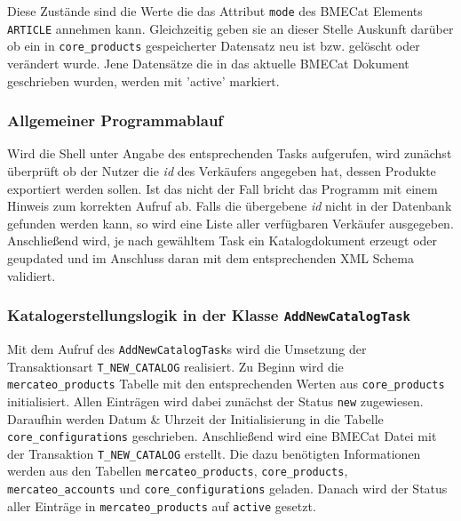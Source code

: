 	Diese Zustände sind die Werte die das Attribut \texttt{mode} des BMECat Elements \texttt{ARTICLE} annehmen kann. Gleichzeitig geben sie an dieser Stelle Auskunft darüber ob ein in \texttt{core\_products} gespeicherter Datensatz neu ist bzw. gelöscht oder verändert wurde. Jene Datensätze die in das aktuelle BMECat Dokument geschrieben wurden, werden mit 'active' markiert.
	
	\subsubsection{Allgemeiner Programmablauf}
	
	Wird die Shell unter Angabe des entsprechenden Tasks aufgerufen, wird zunächst überprüft ob der Nutzer die \textit{id} des Verkäufers angegeben hat, dessen Produkte exportiert werden sollen. Ist das nicht der Fall bricht das Programm mit einem Hinweis zum korrekten Aufruf ab. Falls die übergebene \textit{id} nicht in der Datenbank gefunden werden kann, so wird eine Liste aller verfügbaren Verkäufer ausgegeben. Anschließend wird, je nach gewähltem Task ein Katalogdokument erzeugt oder geupdated und im Anschluss daran mit dem entsprechenden XML Schema validiert. 
	
	\subsubsection{Katalogerstellungslogik in der Klasse \texttt{AddNewCatalogTask}}
	
	Mit dem Aufruf des \texttt{AddNewCatalogTask}s wird die Umsetzung der Transaktionsart \texttt{T\_NEW\_CATALOG} realisiert. Zu Beginn wird die \texttt{mercateo\_products} Tabelle mit den entsprechenden Werten aus \texttt{core\_products} initialisiert. Allen Einträgen wird dabei zunächst der Status \texttt{new} zugewiesen. Daraufhin werden Datum \& Uhrzeit der Initialisierung in die Tabelle \texttt{core\_configurations} geschrieben. Anschließend wird eine BMECat Datei mit der Transaktion \texttt{T\_NEW\_CATALOG} erstellt. Die dazu benötigten Informationen werden aus den Tabellen \texttt{mercateo\_products}, \texttt{core\_products}, \texttt{mercateo\_accounts} und \texttt{core\_configurations} geladen. Danach wird der Status aller Einträge in \texttt{mercateo\_products} auf \texttt{active} gesetzt. 
	
